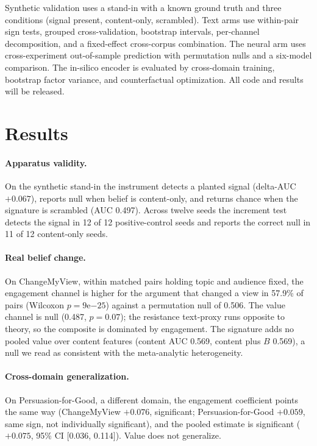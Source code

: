 \documentclass[11pt]{article}
\begin{document}
Synthetic validation uses a stand-in with a known ground truth and three conditions (signal present,
content-only, scrambled). Text arms use within-pair sign tests, grouped cross-validation, bootstrap
intervals, per-channel decomposition, and a fixed-effect cross-corpus combination. The neural arm uses
cross-experiment out-of-sample prediction with permutation nulls and a six-model comparison. The in-silico
encoder is evaluated by cross-domain training, bootstrap factor variance, and counterfactual optimization.
All code and results will be released.

\section{Results}
\paragraph{Apparatus validity.} On the synthetic stand-in the instrument detects a planted signal
(delta-AUC $+0.067$), reports null when belief is content-only, and returns chance when the signature is
scrambled (AUC 0.497). Across twelve seeds the increment test detects the signal in 12 of 12
positive-control seeds and reports the correct null in 11 of 12 content-only seeds.

\paragraph{Real belief change.} On ChangeMyView, within matched pairs holding topic and audience fixed,
the engagement channel is higher for the argument that changed a view in 57.9\% of pairs (Wilcoxon $p =
9\mathrm{e}{-25}$) against a permutation null of 0.506. The value channel is null (0.487, $p = 0.07$); the
resistance text-proxy runs opposite to theory, so the composite is dominated by engagement. The signature
adds no pooled value over content features (content AUC 0.569, content plus $B$ 0.569), a null we read as
consistent with the meta-analytic heterogeneity.

\paragraph{Cross-domain generalization.} On Persuasion-for-Good, a different domain, the engagement
coefficient points the same way (ChangeMyView $+0.076$, significant; Persuasion-for-Good $+0.059$, same
sign, not individually significant), and the pooled estimate is significant ($+0.075$, 95\% CI [0.036,
0.114]). Value does not generalize.
\end{document}
